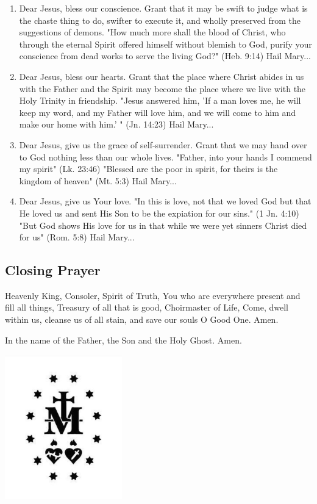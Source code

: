 \documentclass{article}
\begin{document}
\begin{multicols}{2}
\begin{enumerate}
\item Dear Jesus, bless our conscience. Grant that it may be swift to judge what is the chaste thing to do, swifter to execute it, and wholly preserved from the suggestions of demons. "How much more shall the blood of Christ, who through the eternal Spirit offered himself without blemish to God, purify your conscience from dead works to serve the living God?" (Heb. 9:14) Hail Mary...

\item Dear Jesus, bless our hearts. Grant that the place where Christ abides in us with the Father and the Spirit may become the place where we live with the Holy Trinity in friendship. "Jesus answered him, 'If a man loves me, he will keep my word, and my Father will love him, and we will come to him and make our home with him.' " (Jn. 14:23) Hail Mary...

\item Dear Jesus, give us the grace of self-surrender. Grant that we may hand over to God nothing less than our whole lives. "Father, into your hands I commend my spirit" (Lk. 23:46) "Blessed are the poor in spirit, for theirs is the kingdom of heaven" (Mt. 5:3) Hail Mary...

\item Dear Jesus, give us Your love. "In this is love, not that we loved God but that He loved us and sent His Son to be the expiation for our sins." (1 Jn. 4:10) "But God shows His love for us in that while we were yet sinners Christ died for us" (Rom. 5:8) Hail Mary...

\end{enumerate}

\subsection*{Closing Prayer}
Heavenly King, Consoler, Spirit of Truth, You who are everywhere present and fill all things, Treasury of all that is good, Choirmaster of Life, Come, dwell within us, cleanse us of all stain, and save our souls O Good One. Amen.

In the name of the Father, the Son and the Holy Ghost. Amen.

\end{multicols}

  \vfill
  \begin{center}    
      \includegraphics [width=2in] {512px-Miraculous_medal_reverse_symbols.jpg}
  \end{center}
  \vfill
  
\end{document}
